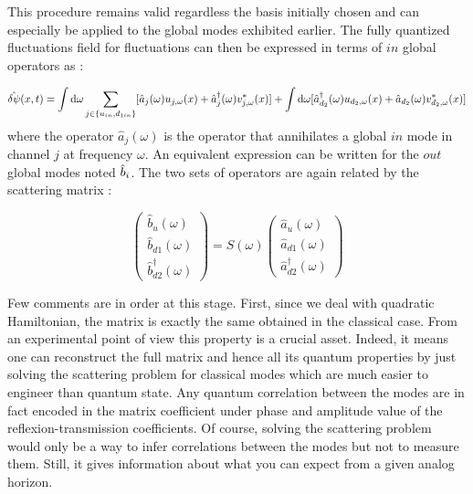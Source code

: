 This procedure remains valid regardless the basis initially chosen and can especially be applied to the global modes exhibited earlier. The fully quantized fluctuations field for fluctuations can then be expressed in terms of $in$ global operators as :

\begin{equation}
    \hat{\delta\psi}(x,t) = \int \mathrm{d}\omega\sum_{j\in \{u_{in},d_{1in}\} }[\hat{a}_j(\omega)u_{j,\omega}(x)+\hat{a}^\dagger_j(\omega)v^*_{j,\omega}(x)] + \int \mathrm{d}\omega[\hat{a}^\dagger_{d_2}(\omega)u_{d_2,\omega}(x)+\hat{a}_{d_2}(\omega)v^*_{d_2,\omega}(x)]
    \label{eq:fluctuation_quantization}
\end{equation}
where the operator $\hat{a}_j(\omega)$ is the operator that annihilates a global $in$ mode in channel $j$ at frequency $\omega$. An equivalent
expression can be written for the $out$ global modes noted $\hat{b}_i$. The two sets of operators are again related by the scattering matrix :

\begin{equation}
    \begin{pmatrix}
        \hat{b}_u(\omega) \\
        \hat{b}_{d1}(\omega) \\
        \hat{b}_{d2}^\dagger(\omega)
    \end{pmatrix}=S(\omega)\begin{pmatrix}
        \hat{a}_u(\omega) \\
        \hat{a}_{d1}(\omega) \\
        \hat{a}_{d2}^\dagger(\omega)    
    \end{pmatrix}
\end{equation}


Few comments are in order at this stage. First, since we deal with quadratic Hamiltonian, the matrix is exactly the same obtained in the classical case.
From an experimental point of view this property is a crucial asset. Indeed, it means one can reconstruct the full matrix and hence all its quantum 
properties by just solving the scattering problem for classical modes which are much easier to engineer than quantum state. Any quantum correlation between the modes are in fact encoded in the matrix coefficient 
under phase and amplitude value of the reflexion-transmission coefficients. Of course, solving the scattering problem
would only be a way to infer correlations between the modes but not to measure them. Still, it gives information about what you can expect from a given 
analog horizon.

